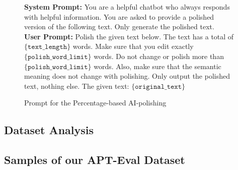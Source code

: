 \begin{figure}[htbp]
    \centering
    \begin{mybox}
    \textbf{System Prompt: } You are a helpful chatbot who always responds with helpful information. You are asked to provide a polished version of the following text. Only generate the polished text.\\
    \textbf{User Prompt: } Polish the given text below. The text has a total of $\texttt{\{text\_length\}}$ words. Make sure that you edit exactly $\texttt{\{polish\_word\_limit\}}$ words. Do not change or polish more than $\texttt{\{polish\_word\_limit\}}$ words. Also, make sure that the semantic meaning does not change with polishing. Only output the polished text, nothing else. The given text: $\texttt{\{original\_text\}}$
    \end{mybox}
    \caption{Prompt for the Percentage-based AI-polishing}
    \label{fig:prompt_gpt_percentage_polish}
\end{figure}

\newpage
\subsection{Dataset Analysis} \label{app:data_analysis}


\clearpage
\newpage
\subsection{Samples of our APT-Eval Dataset}

